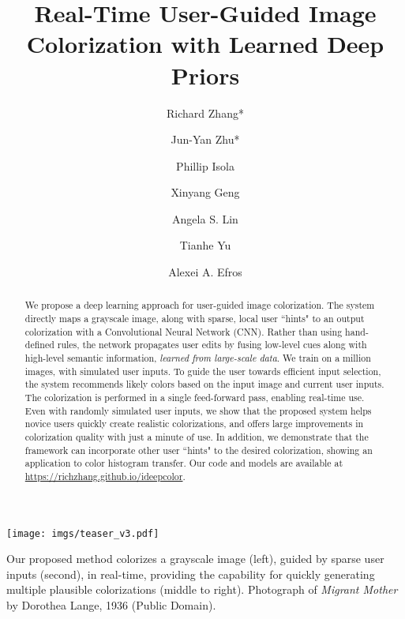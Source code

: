 \documentclass[acmtog,authorversion]{acmart}
\begin{document}
\title{Real-Time User-Guided Image Colorization with Learned Deep Priors} 
\author{Richard Zhang*}
\author{Jun-Yan Zhu*}
\author{Phillip Isola}
\author{Xinyang Geng}
\author{Angela S. Lin}
\author{Tianhe Yu}
\author{Alexei A. Efros}

\begin{teaserfigure}
   \centering
\texttt{[image: imgs/teaser\_v3.pdf]}
\vspace{-6mm}
\caption{Our proposed method colorizes a grayscale image (left), guided by sparse user inputs (second), in real-time, providing the capability for quickly generating multiple plausible colorizations (middle to right). Photograph of \textit{Migrant Mother} by Dorothea Lange, 1936 (Public Domain).}
\end{teaserfigure}

\begin{abstract}
We propose a deep learning approach for user-guided image colorization. The system directly maps a grayscale image, along with sparse, local user ``hints" to an output colorization with a Convolutional Neural Network (CNN). Rather than using hand-defined rules, the network propagates user edits by fusing low-level cues along with high-level semantic information, \textit{learned from large-scale data}. We train on a million images, with simulated user inputs. To guide the user towards efficient input selection, the system recommends likely colors based on the input image and current user inputs. The colorization is performed in a single feed-forward pass, enabling real-time use. Even with randomly simulated user inputs, we show that the proposed system helps novice users quickly create realistic colorizations, and offers large improvements in colorization quality with just a minute of use. In addition, we demonstrate that the framework can incorporate other user ``hints" to the desired colorization, showing an application to color histogram transfer. Our code and models are available at \url{https://richzhang.github.io/ideepcolor}.
\end{abstract}
\end{document}
